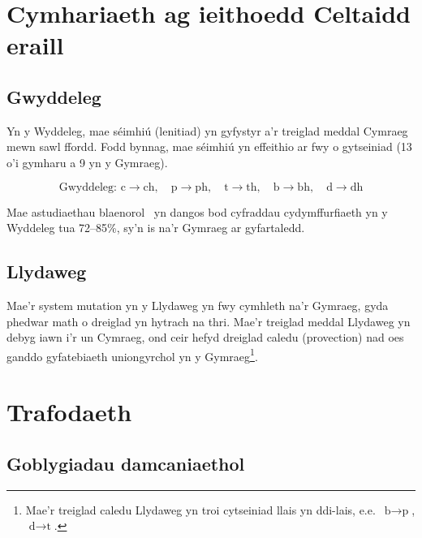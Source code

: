 \documentclass[12pt,a4paper]{article}
\begin{document}
\section{Cymhariaeth ag ieithoedd Celtaidd eraill}
\label{sec:cymharu}

\subsection{Gwyddeleg}

Yn y Wyddeleg, mae s\'{e}imhi\'{u} (lenitiad) yn gyfystyr a'r
treiglad meddal Cymraeg mewn sawl ffordd. Fodd bynnag, mae
s\'{e}imhi\'{u} yn effeithio ar fwy o gytseiniad (13 o'i
gymharu a 9 yn y Gymraeg).

\begin{equation}
\label{eq:gwyddeleg}
\text{Gwyddeleg: } \text{c} \to \text{ch}, \quad
\text{p} \to \text{ph}, \quad
\text{t} \to \text{th}, \quad
\text{b} \to \text{bh}, \quad
\text{d} \to \text{dh}
\end{equation}

Mae astudiaethau blaenorol~\citep{nig2008} yn dangos bod
cyfraddau cydymffurfiaeth yn y Wyddeleg tua 72--85\%, sy'n
is na'r Gymraeg ar gyfartaledd.

\subsection{Llydaweg}

Mae'r system mutation yn y Llydaweg yn fwy cymhleth na'r
Gymraeg, gyda phedwar math o dreiglad yn hytrach na thri.
Mae'r treiglad meddal Llydaweg yn debyg iawn i'r un Cymraeg,
ond ceir hefyd dreiglad caledu (provection) nad oes ganddo
gyfatebiaeth uniongyrchol yn y Gymraeg\footnote{%
Mae'r treiglad caledu Llydaweg yn troi cytseiniad llais
yn ddi-lais, e.e.\ $\text{b} \to \text{p}$, $\text{d} \to \text{t}$.}.

\section{Trafodaeth}
\label{sec:trafodaeth}

\subsection{Goblygiadau damcaniaethol}
\end{document}
